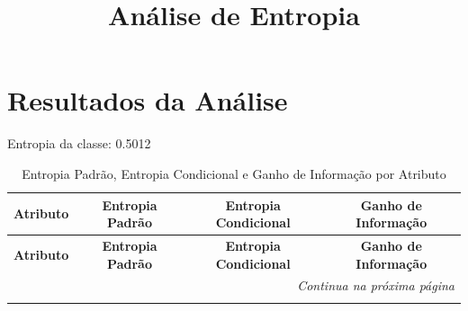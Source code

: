 \documentclass{article}
\begin{document}
\title{Análise de Entropia}
\author{}
\date{}
\maketitle

\section{Resultados da Análise}

Entropia da classe: 0.5012

\vspace{1em}

\begin{longtable}{|l|c|c|c|}
\caption{Entropia Padrão, Entropia Condicional e Ganho de Informação por Atributo} \\
\hline
\textbf{Atributo} & \textbf{Entropia Padrão} & \textbf{Entropia Condicional} & \textbf{Ganho de Informação} \\
\hline
\endfirsthead

\hline
\textbf{Atributo} & \textbf{Entropia Padrão} & \textbf{Entropia Condicional} & \textbf{Ganho de Informação} \\
\hline
\endhead

\hline
\multicolumn{4}{r}{\textit{Continua na próxima página}} \\
\endfoot

\hline
\endlastfoot


\end{longtable}
\end{document}
